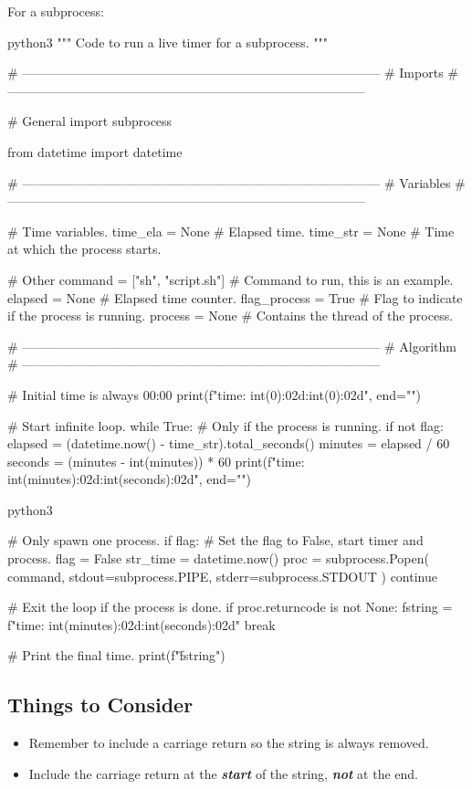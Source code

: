 For a subprocess:
\begin{mintedbox}{python3}
"""
    Code to run a live timer for a subprocess.
"""

# ------------------------------------------------------------------------------------
# Imports
# ------------------------------------------------------------------------------------

# General
import subprocess

from datetime import datetime

# ------------------------------------------------------------------------------------
# Variables
# ------------------------------------------------------------------------------------

# Time variables.
time_ela = None  # Elapsed time.
time_str = None  # Time at which the process starts.

# Other
command = ["sh", "script.sh"]  # Command to run, this is an example.
elapsed = None  # Elapsed time counter.
flag_process = True  # Flag to indicate if the process is running.
process = None  # Contains the thread of the process.

# ------------------------------------------------------------------------------------
# Algorithm
# ------------------------------------------------------------------------------------

# Initial time is always 00:00
print(f"\rElapsed time: {int(0):02d}:{int(0):02d}", end="")

# Start infinite loop.
while True:
    # Only if the process is running.
    if not flag:
        elapsed = (datetime.now() - time_str).total_seconds()
        minutes = elapsed / 60
        seconds = (minutes - int(minutes)) * 60
        print(f"\rElapsed time: {int(minutes):02d}:{int(seconds):02d}", end="")

\end{mintedbox}
\newpage
\begin{mintedbox}{python3}

    # Only spawn one process.
    if flag:
        # Set the flag to False, start timer and process.
        flag = False
        str_time = datetime.now()
        proc = subprocess.Popen(
            command, stdout=subprocess.PIPE, stderr=subprocess.STDOUT
        )
        continue

    # Exit the loop if the process is done.
    if proc.returncode is not None:
        fstring = f"\rElapsed time: {int(minutes):02d}:{int(seconds):02d}"
        break

# Print the final time.
print(f"\r{fstring}")

\end{mintedbox}
\subsection*{Things to Consider}
\begin{itemize}
    \item Remember to include a carriage return so the string is always removed.
    \item Include the carriage return at the \textbf{\textit{start}} of the string,
          \textbf{\textit{not}} at the end.
\end{itemize}

